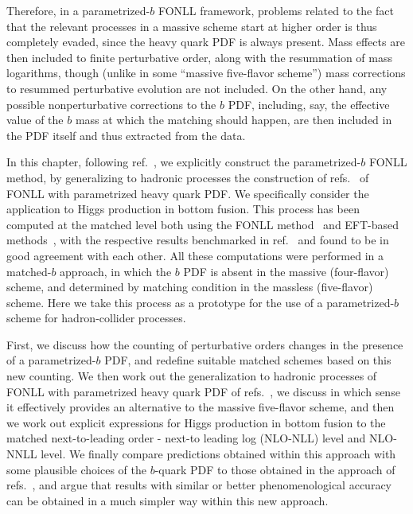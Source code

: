 Therefore, in a parametrized-$b$ FONLL framework, problems
related to the fact that the relevant processes in a massive scheme start
at higher order is thus completely
evaded, since the heavy quark 
PDF is always present. Mass effects are then included to finite
perturbative order, along with the resummation of mass logarithms, though
(unlike in some  ``massive five-flavor scheme'') mass corrections to
resummed perturbative evolution are not included. On the other hand,
any possible nonperturbative corrections to the $b$ PDF, including,
say, the effective value of the $b$ mass at which the matching should
happen, are then included in the PDF itself and thus extracted from
the data.

In this chapter, following ref.~\cite{Forte:2019hjc}, we explicitly construct the parametrized-$b$ FONLL method, by
generalizing to hadronic processes the construction 
of refs.~\cite{Ball:2015tna,Ball:2015dpa} of FONLL  with
parametrized heavy quark PDF. We specifically consider the
application to Higgs production in bottom fusion. This process has
been computed at the matched level both using the FONLL
method~\cite{Forte:2015hba,Forte:2016sja} and EFT-based
methods~\cite{Bonvini:2015pxa,Bonvini:2016fgf}, with the respective results
benchmarked in
ref.~\cite{deFlorian:2016spz} and found to be in good agreement with
each other. All these computations were performed
in a matched-$b$ approach, in which the $b$ PDF  is absent in the
massive (four-flavor) scheme, and determined by matching condition in
the massless (five-flavor) scheme. Here we  take this process as
a prototype for the use of a parametrized-$b$  scheme
for hadron-collider processes.

First, we discuss how the counting of perturbative orders changes
in the presence of a parametrized-$b$ PDF, and redefine suitable
matched schemes based on this new counting. We  then work out the
generalization to hadronic processes of FONLL with
parametrized heavy quark PDF of refs.~\cite{Ball:2015tna,Ball:2015dpa},
we discuss in which sense it effectively provides an alternative to the
massive five-flavor scheme, and then we work out explicit expressions for
Higgs production in bottom fusion to the matched next-to-leading order
- next-to leading log (NLO-NLL) level and NLO-NNLL level. We 
finally compare
predictions obtained within this approach with some plausible choices
of the $b$-quark PDF to those obtained in the approach of
refs.~\cite{Forte:2015hba,Forte:2016sja}, and argue that results with
similar or better phenomenological accuracy can be obtained in a much
simpler way within this new approach.

